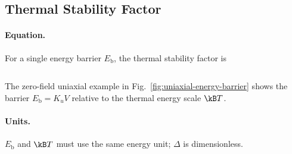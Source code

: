 \subsection{Thermal Stability Factor}

\paragraph{Equation.}
For a single energy barrier $E_{\mathrm{b}}$, the thermal stability factor
is~\cite{ee237-week10}

\begin{equation}
    
\end{equation}

The zero-field uniaxial example in
Fig.~\ref{fig:uniaxial-energy-barrier} shows the barrier $E_{\mathrm b}=K_uV$
relative to the thermal energy scale $\kB T$.

\paragraph{Units.}
$E_{\mathrm{b}}$ and $\kB T$ must use the same energy unit; $\Delta$ is dimensionless.
